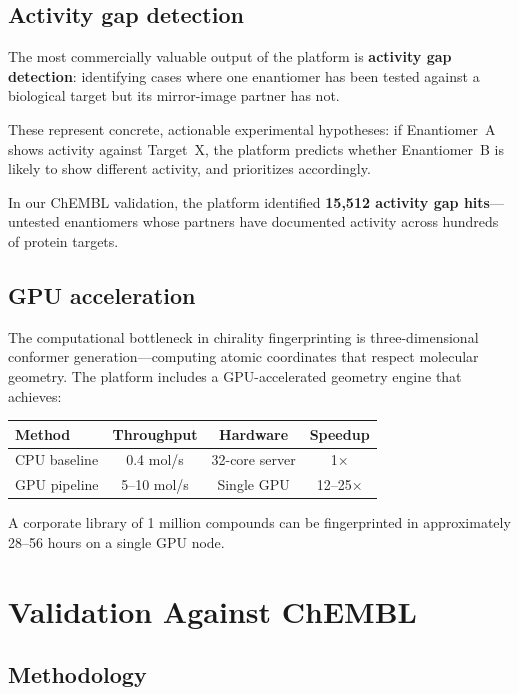 \documentclass[11pt,a4paper]{article}
\begin{document}
\subsection{Activity gap detection}

The most commercially valuable output of the platform is \textbf{activity gap
detection}: identifying cases where one enantiomer has been tested against
a biological target but its mirror-image partner has not.

These represent concrete, actionable experimental hypotheses: if Enantiomer~A
shows activity against Target~X, the platform predicts whether Enantiomer~B
is likely to show different activity, and prioritizes accordingly.

In our ChEMBL validation, the platform identified \textbf{15,512 activity gap
hits}---untested enantiomers whose partners have documented activity across
hundreds of protein targets.

\subsection{GPU acceleration}

The computational bottleneck in chirality fingerprinting is three-dimensional
conformer generation---computing atomic coordinates that respect molecular
geometry. The platform includes a GPU-accelerated geometry engine that
achieves:

\begin{center}
\begin{tabular}{lccc}
\toprule
\textbf{Method} & \textbf{Throughput} & \textbf{Hardware} & \textbf{Speedup} \\
\midrule
CPU baseline & 0.4 mol/s & 32-core server & 1$\times$ \\
GPU pipeline & 5--10 mol/s & Single GPU & 12--25$\times$ \\
\bottomrule
\end{tabular}
\end{center}

A corporate library of 1 million compounds can be fingerprinted in approximately
28--56 hours on a single GPU node.

\newpage

\section{Validation Against ChEMBL}

\subsection{Methodology}
\end{document}
